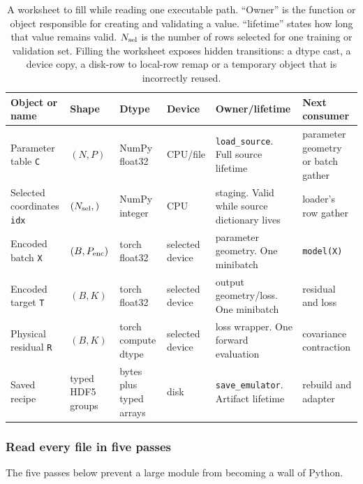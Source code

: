 \documentclass[10pt,aps,prd,twocolumn,nofootinbib]{revtex4-2}
\newcommand{\code}[1]{\texttt{#1}}
\begin{document}
\begin{table}[t]
\centering
\begin{tabular}{p{}p{}p{}p{}p{}p{}}
\toprule
Object or name & Shape & Dtype & Device & Owner/lifetime & Next consumer \\
\midrule
Parameter table \code{C} & $(N,P)$ & NumPy float32 & CPU/file &
\code{load\_source}.  Full source lifetime & parameter geometry or batch gather \\
Selected coordinates \code{idx} & $(N_{\rm sel},)$ & NumPy integer & CPU &
staging.  Valid while source dictionary lives & loader's row gather \\
Encoded batch \code{X} & $(B,P_{\rm enc})$ & torch float32 & selected device &
parameter geometry.  One minibatch & \code{model(X)} \\
Encoded target \code{T} & $(B,K)$ & torch float32 & selected device &
output geometry/loss.  One minibatch & residual and loss \\
Physical residual \code{R} & $(B,K)$ & torch compute dtype & selected device &
loss wrapper.  One forward evaluation & covariance contraction \\
Saved recipe & typed HDF5 groups & bytes plus typed arrays & disk &
\code{save\_emulator}.  Artifact lifetime & rebuild and adapter \\
\bottomrule
\end{tabular}
\caption{A worksheet to fill while reading one executable path.  ``Owner'' is
the function or object responsible for creating and validating a value.
``lifetime'' states how long that value remains valid.  $N_{\rm sel}$ is the
number of rows selected for one training or validation set.  Filling the
worksheet exposes hidden transitions: a dtype cast, a device copy, a disk-row
to local-row remap or a temporary object that is incorrectly reused.}
\label{tab:reading-worksheet}
\end{table}

\subsubsection{Read every file in five passes}

The five passes below prevent a large module from becoming a wall of Python.
\end{document}

